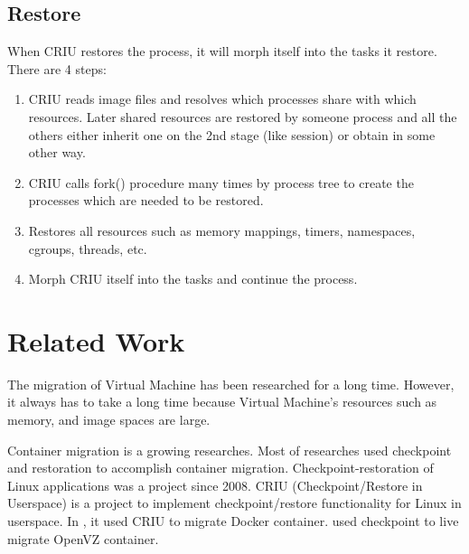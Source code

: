 \subsection{Restore}
When CRIU restores the process, it will morph itself into the tasks it restore.   There are 4 steps:
\begin{enumerate}[Step 1.]
	\item CRIU reads image files and resolves which processes share with which resources.  Later shared resources are restored by someone process and all the others either inherit one on the 2nd stage (like session) or obtain in some other way.
    \item CRIU calls fork() procedure many times by process tree to create the processes which are needed to be restored.
    \item Restores all resources such as memory mappings, timers, namespaces, cgroups, threads, etc.
    \item Morph CRIU itself into the tasks and continue the process.
\end{enumerate}

\section{Related Work}
The migration of Virtual Machine \cite{clark2005live, liu2013performance} has been researched for a long time.
However, it always has to take a long time because Virtual Machine's resources such as memory, and image spaces are large.

Container migration is a growing researches. Most of researches used checkpoint and restoration to accomplish container migration.
Checkpoint-restoration of Linux applications \cite{laadan2010linux} was a project since 2008. CRIU (Checkpoint/Restore in Userspace) is a project to implement checkpoint/restore functionality for Linux in userspace.
In \cite{yang2015checkpoint}, it used CRIU to migrate Docker container.
\cite{mirkin2008containers} used checkpoint to live migrate OpenVZ container.